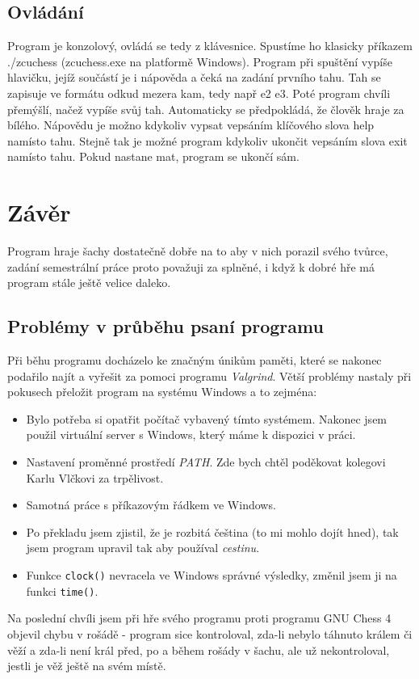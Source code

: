 \documentclass[11pt, titlepage]{article}
\begin{document}
\subsection{Ovládání}

Program je konzolový, ovládá se tedy z klávesnice. Spustíme ho klasicky příkazem ./zcuchess (zcuchess.exe na platformě Windows). Program při spuštění vypíše hlavičku, jejíž součástí je i nápověda a čeká na zadání prvního tahu. Tah se zapisuje ve formátu odkud mezera kam, tedy např e2 e3. Poté program chvíli přemýšlí, načež vypíše svůj tah. Automaticky se předpokládá, že člověk hraje za bílého. Nápovědu je možno kdykoliv vypsat vepsáním klíčového slova help namísto tahu. Stejně tak je možné program kdykoliv ukončit vepsáním slova exit namísto tahu. Pokud nastane mat, program se ukončí sám.

\section{Závěr}
Program hraje šachy dostatečně dobře na to aby v nich porazil svého tvůrce, zadání semestrální práce proto považuji za splněné, i když k dobré hře má program stále ještě velice daleko.

\subsection{Problémy v průběhu psaní programu}
Při běhu programu docházelo ke značným únikům paměti, které se nakonec podařilo najít a vyřešit za pomoci programu { \it Valgrind}.
Větší problémy nastaly při pokusech přeložit program na systému Windows a to zejména:
\begin{itemize}
	\item Bylo potřeba si opatřit počítač vybavený tímto systémem. Nakonec jsem použil virtuální server s Windows, který máme k dispozici v práci.
	\item Nastavení proměnné prostředí { \it PATH}. Zde bych chtěl poděkovat kolegovi Karlu Vlčkovi za trpělivost.
	\item Samotná práce s příkazovým řádkem ve Windows.
	\item Po překladu jsem zjistil, že je rozbitá čeština (to mi mohlo dojít hned), tak jsem program upravil tak aby používal { \it cestinu}.
	\item Funkce { \tt clock()} nevracela ve Windows správné výsledky, změnil jsem ji na funkci { \tt time()}.
\end{itemize}
Na poslední chvíli jsem při hře svého programu proti programu GNU Chess 4 objevil chybu v rošádě - program sice kontroloval, zda-li nebylo táhnuto králem či věží a zda-li není král před, po a během rošády v šachu, ale už nekontroloval, jestli je věž ještě na svém místě.
\end{document}
